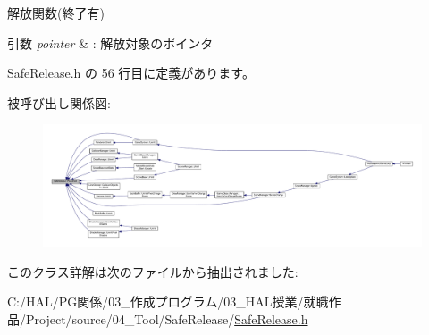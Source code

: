 解放関数(終了有) 


\begin{DoxyParams}{引数}
{\em pointer} & \+: 解放対象のポインタ \\
\hline
\end{DoxyParams}


 Safe\+Release.\+h の 56 行目に定義があります。

被呼び出し関係図\+:
\nopagebreak
\begin{figure}[H]
\begin{center}
\leavevmode
\includegraphics[width=350pt]{class_safe_release_a06160f5466a88f021e6f28489de9df1e_icgraph}
\end{center}
\end{figure}


このクラス詳解は次のファイルから抽出されました\+:\begin{DoxyCompactItemize}
\item 
C\+:/\+H\+A\+L/\+P\+G関係/03\+\_\+作成プログラム/03\+\_\+\+H\+A\+L授業/就職作品/\+Project/source/04\+\_\+\+Tool/\+Safe\+Release/\mbox{\hyperlink{_safe_release_8h}{Safe\+Release.\+h}}\end{DoxyCompactItemize}
